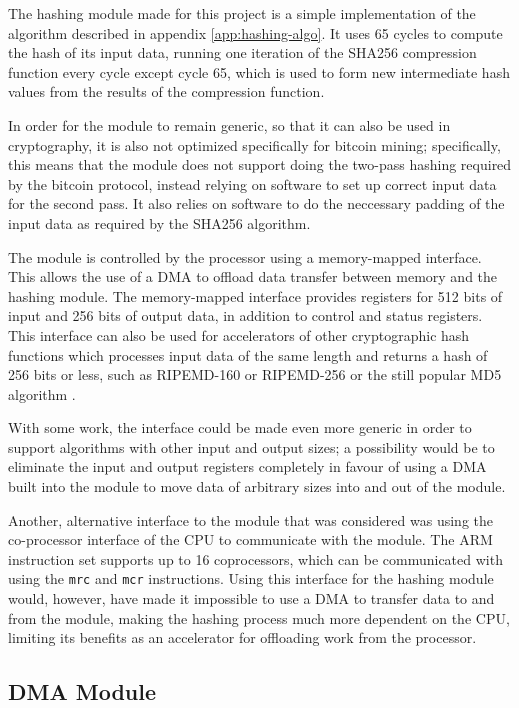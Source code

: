 The hashing module made for this project is a simple implementation of the algorithm described in
appendix \ref{app:hashing-algo}. It uses 65 cycles to compute the hash of its input data, running
one iteration of the SHA256 compression function every cycle except cycle 65, which is used to
form new intermediate hash values from the results of the compression function.

In order for the module to remain generic, so that it can also be used in cryptography, it
is also not optimized specifically for bitcoin mining; specifically, this means that the module
does not support doing the two-pass hashing required by the bitcoin protocol, instead relying
on software to set up correct input data for the second pass. It also relies on software to
do the neccessary padding of the input data as required by the SHA256 algorithm.

The module is controlled by the processor using a memory-mapped interface. This allows the use
of a DMA to offload data transfer between memory and the hashing module. The memory-mapped interface
provides registers for 512 bits of input and 256 bits of output data, in addition to control and
status registers. This interface can also be used for accelerators of other cryptographic hash
functions which processes input data of the same length and returns a hash of 256 bits or less,
such as RIPEMD-160 or RIPEMD-256 \cite{ripemd} or the still popular MD5 algorithm \cite{md5}.

With some work, the interface could be made even more generic in order to support algorithms
with other input and output sizes; a possibility would be to eliminate the input and output
registers completely in favour of using a DMA built into the module to move data of arbitrary
sizes into and out of the module.

Another, alternative interface to the module that was considered was using the co-processor interface
of the CPU to communicate with the module. The ARM instruction set supports up to 16 coprocessors,
which can be communicated with using the \texttt{mrc} and \texttt{mcr} instructions. Using this
interface for the hashing module would, however, have made it impossible to use a DMA to transfer
data to and from the module, making the hashing process much more dependent on the CPU, limiting
its benefits as an accelerator for offloading work from the processor.

\subsection{DMA Module}

